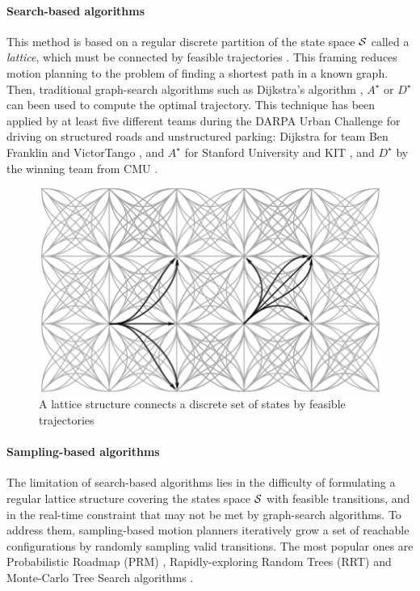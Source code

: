 \paragraph{Search-based algorithms}

This method is based on a regular discrete partition of the state space $\mathcal{S}$ called a \emph{lattice}, which must be connected by feasible trajectories \citep[\eg][]{Pivtoraiko2005}. This framing reduces motion planning to the problem of finding a shortest path in a known graph. Then, traditional graph-search algorithms such as Dijkstra's algorithm \citep{Dijkstra1959}, $A^\star$ \citep{Hart1968} or $D^\star$ \citep{Stentz1994} can been used to compute the optimal trajectory. This technique has been applied by at least five different teams during the DARPA Urban Challenge for driving on structured roads and unstructured parking: Dijkstra for team Ben Franklin \citep{Bohren2008} and VictorTango \citep{Bacha2008}, and $A^\star$ for Stanford University \citep{Montemerlo2008} and KIT \citep{Kammel2008}, and $D^\star$ by the winning team from CMU \citep{Urmson2008}.

\begin{figure}[tp]
	\centering
	\includegraphics[width=0.5\linewidth]{img/lattice2}
	\caption{A lattice structure connects a discrete set of states by feasible trajectories}
\end{figure}

\paragraph{Sampling-based algorithms}

The limitation of search-based algorithms lies in the difficulty of formulating a regular lattice structure covering the states space $\mathcal{S}$ with feasible transitions, and in the real-time constraint that may not be met by graph-search algorithms. To address them, sampling-based motion planners iteratively grow a set of reachable configurations by randomly sampling valid transitions. The most popular ones are Probabilistic Roadmap (PRM) \citep{Kavraki1996}, Rapidly-exploring Random Trees (RRT) \citep{Lavalle98,Karaman2011} and Monte-Carlo Tree Search algorithms \citep[e.g.][]{Kocsis2006}.

